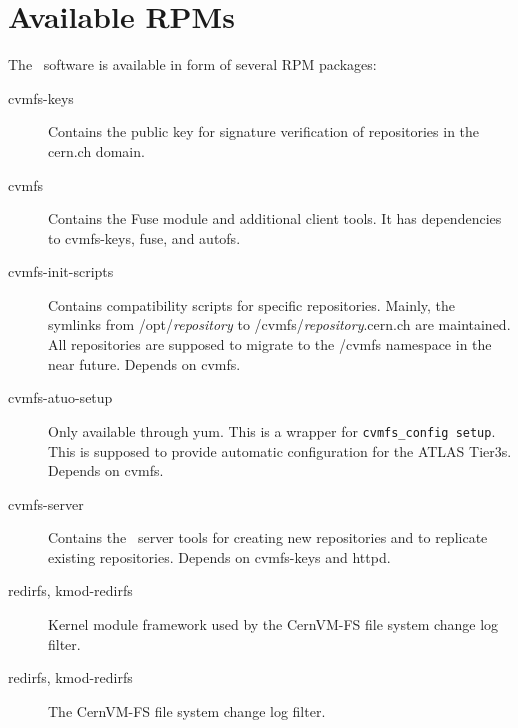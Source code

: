 \chapter{Available RPMs}
\label{apx:rpms}

The \cvmfs\ software is available in form of several RPM packages:
\begin{description}
	\item[cvmfs-keys] Contains the public key for signature verification of repositories in the cern.ch domain.
	\item[cvmfs] Contains the Fuse module and additional client tools.  It has dependencies to cvmfs-keys, fuse, and autofs.
	\item[cvmfs-init-scripts] Contains compatibility scripts for specific repositories.  
		Mainly, the symlinks from /opt/\emph{repository} to /cvmfs/\emph{repository}.cern.ch are maintained.
		All repositories are supposed to migrate to the /cvmfs namespace in the near future.
		Depends on cvmfs.
	\item[cvmfs-atuo-setup] Only available through yum. 
		This is a wrapper for \lstinline{cvmfs_config setup}. 
		This is supposed to provide automatic configuration for the ATLAS Tier3s.
		Depends on cvmfs.
	\item[cvmfs-server] Contains the \cvmfs\ server tools for creating new repositories and to replicate existing repositories.
		Depends on cvmfs-keys and httpd.
	\item[redirfs, kmod-redirfs] Kernel module framework used by the CernVM-FS file system change log filter. 
	\item[redirfs, kmod-redirfs] The CernVM-FS file system change log filter.
\end{description}
